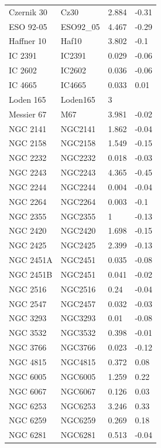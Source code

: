 \documentclass[fleqn,usenatbib]{mnras}
\begin{document}
\begin{table}
\begin{tabular}{l l l l}
            Czernik 30 & Cz30 & 2.884 & -0.31 \\
            ESO 92-05 & ESO92\_05 & 4.467 & -0.29 \\
            Haffner 10 & Haf10 & 3.802 & -0.1 \\
            IC 2391 & IC2391 & 0.029 & -0.06 \\
            IC 2602 & IC2602 & 0.036 & -0.06 \\
            IC 4665 & IC4665 & 0.033 & 0.01 \\
            Loden 165 & Loden165 & 3 &  \\
            Messier 67 & M67 & 3.981 & -0.02 \\
            NGC 2141 & NGC2141 & 1.862 & -0.04 \\
            NGC 2158 & NGC2158 & 1.549 & -0.15 \\
            NGC 2232 & NGC2232 & 0.018 & -0.03 \\
            NGC 2243 & NGC2243 & 4.365 & -0.45 \\
            NGC 2244 & NGC2244 & 0.004 & -0.04 \\
            NGC 2264 & NGC2264 & 0.003 & -0.1 \\
            NGC 2355 & NGC2355 & 1 & -0.13 \\
            NGC 2420 & NGC2420 & 1.698 & -0.15 \\
            NGC 2425 & NGC2425 & 2.399 & -0.13 \\
            NGC 2451A & NGC2451 & 0.035 & -0.08 \\
            NGC 2451B & NGC2451 & 0.041 & -0.02 \\
            NGC 2516 & NGC2516 & 0.24 & -0.04 \\
            NGC 2547 & NGC2457 & 0.032 & -0.03 \\
            NGC 3293 & NGC3293 & 0.01 & -0.08 \\
            NGC 3532 & NGC3532 & 0.398 & -0.01 \\
            NGC 3766 & NGC3766 & 0.023 & -0.12 \\
            NGC 4815 & NGC4815 & 0.372 & 0.08 \\
            NGC 6005 & NGC6005 & 1.259 & 0.22 \\
            NGC 6067 & NGC6067 & 0.126 & 0.03 \\
            NGC 6253 & NGC6253 & 3.246 & 0.33 \\
            NGC 6259 & NGC6259 & 0.269 & 0.18 \\
            NGC 6281 & NGC6281 & 0.513 & -0.04 \\

\end{tabular}
\end{table}
\end{document}
